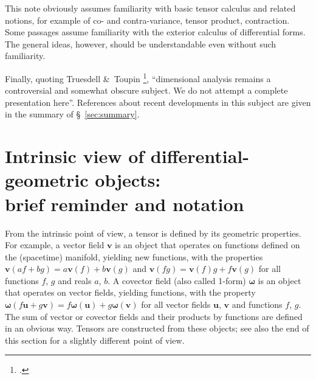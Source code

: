 \documentclass[\ifafour a4paper,12pt,\else a5paper,10pt,\fi%
onecolumn,oneside,article,%
british%
]{memoir}
\theoremstyle{remark}
\theoremstyle{innote}
\newcommand*{\citep}{\footcites}
\newcommand*{\amp}{\&}
\newcommand*{\dotv}{\mathord{\,\cdot\,}}%
\renewcommand*{\|}[1][]{\nonscript\,#1\vert\nonscript\;\mathopen{}}
\newcommand*{\sect}{\S}%
\newcommand*{\yom}{\bm{\omega}}
\newcommand*{\yv}{\bm{v}}
\newcommand*{\yu}{\bm{u}}
\begin{document}
This note obviously assumes familiarity with basic tensor calculus and
related notions, for example of co- and contra-variance, tensor product,
contraction. Some passages assume familiarity with the exterior calculus of
differential forms. The general ideas, however, should be understandable
even without such familiarity.








Finally, quoting Truesdell \amp\ Toupin \citep[Appendix \sect~7
footnote~4]{truesdelletal1960}, \enquote{dimensional analysis remains a
  controversial and somewhat obscure subject. We do not attempt a complete
  presentation here}. References about recent developments in this subject
are given in the summary of \sect~\ref{sec:summary}.




\section{Intrinsic view of differential-geometric objects:\\ brief
  reminder and notation}
\label{sec:remined}


From the intrinsic point of view, a tensor is defined by its geometric
properties. For example, a vector field $\yv$ %
is an object that operates on functions defined on the (spacetime)
manifold, yielding new functions, with the properties
$\yv(af+bg)=a\yv(f)+b\yv(g)$ and $\yv(fg)=\yv(f)g+f\yv(g)$ for all
functions $f$, $g$ and reals $a$, $b$. A covector field (also called
1-form) $\yom$ is an object that operates on vector fields, yielding
functions, with the property $\yom(f\yu+g\yv)=f\yom(\yu)+g\yom(\yv)$ for
all vector fields $\yu$, $\yv$ and functions $f$, $g$. The sum of vector or
covector fields and their products by functions are defined in an obvious
way. Tensors are constructed from these objects; see also the end of this
section for a slightly different point of view.
\end{document}

